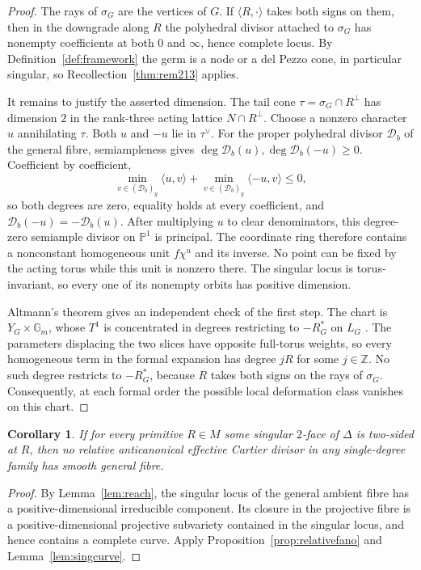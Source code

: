 \documentclass[11pt]{amsart}
\newtheorem{corollary}[theorem]{Corollary}
\theoremstyle{definition}
\theoremstyle{remark}
\theoremstyle{plain}
\newcommand{\ZZ}{\mathbb{Z}}
\newcommand{\PP}{\mathbb{P}}
\newcommand{\cD}{\mathcal{D}}
\begin{document}
\begin{proof}
The rays of $\sigma_G$ are the vertices of $G$.  If $\langle R,\cdot\rangle$
takes both signs on them, then in the downgrade along $R$ the polyhedral divisor
attached to $\sigma_G$ has nonempty coefficients at both $0$ and $\infty$, hence
complete locus.  By Definition~\ref{def:framework} the germ is a node or a del
Pezzo cone, in particular singular, so Recollection~\ref{thm:rem213} applies.

It remains to justify the asserted dimension.  The tail cone
$\tau=\sigma_G\cap R^\perp$ has dimension $2$ in the rank-three acting lattice
$N\cap R^\perp$.  Choose a nonzero character $u$ annihilating $\tau$.  Both
$u$ and $-u$ lie in $\tau^\vee$.  For the proper polyhedral divisor $\cD_b$ of
the general fibre, semiampleness gives
$\deg\cD_b(u),\deg\cD_b(-u)\ge0$.  Coefficient by coefficient,
\[
 \min_{v\in(\cD_b)_y}\langle u,v\rangle
 +\min_{v\in(\cD_b)_y}\langle-u,v\rangle\le0,
\]
so both degrees are zero, equality holds at every coefficient, and
$\cD_b(-u)=-\cD_b(u)$.  After multiplying $u$ to clear denominators, this
degree-zero semiample divisor on $\PP^1$ is principal.  The coordinate ring
therefore contains a nonconstant homogeneous unit $f\chi^u$ and its inverse.
No point can be fixed by the acting torus while this unit is nonzero there.
The singular locus is torus-invariant, so every one of its nonempty orbits has
positive dimension.

Altmann's theorem gives an independent check of the first step.  The chart is
$Y_G\times\mathbb G_m$, whose $T^1$ is concentrated in degrees restricting to
$-R_G^*$ on $L_G$ \cite[Thm.~(6.5)]{Altmann95}.  The parameters displacing
the two slices have opposite full-torus weights, so every homogeneous term
in the formal expansion has degree $jR$ for some $j\in\ZZ$.  No such degree
restricts to $-R_G^*$, because $R$ takes both signs on the rays of $\sigma_G$.
Consequently, at each formal order the possible local deformation class
vanishes on this chart.
\end{proof}

\begin{corollary}\label{cor:reach}
If for every primitive $R \in M$ some singular $2$-face of $\Delta$ is
two-sided at $R$, then no relative anticanonical effective Cartier divisor in
any single-degree family has smooth general fibre.
\end{corollary}

\begin{proof}
By Lemma~\ref{lem:reach}, the singular locus of the general ambient fibre has
a positive-dimensional irreducible component.  Its closure in the projective
fibre is a positive-dimensional projective subvariety contained in the
singular locus, and hence contains a complete curve.  Apply
Proposition~\ref{prop:relativefano} and Lemma~\ref{lem:singcurve}.
\end{proof}
\end{document}
